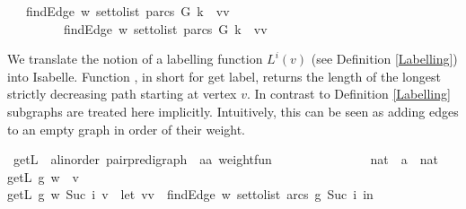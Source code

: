 \begin{isabellebody}
\ \ \ {\isachardoublequoteopen}{\isacharparenleft}findEdge\ w\ {\isacharparenleft}set{\isacharunderscore}to{\isacharunderscore}list\ {\isacharparenleft}parcs\ G{\isacharparenright}{\isacharparenright}\ k{\isacharparenright}\ {\isacharequal}\ {\isacharparenleft}vv\ \isanewline
\ \ \ \ \ \ \ \ {\isasymor}\ {\isacharparenleft}findEdge\ w\ {\isacharparenleft}set{\isacharunderscore}to{\isacharunderscore}list\ {\isacharparenleft}parcs\ G{\isacharparenright}{\isacharparenright}\ k{\isacharparenright}\ {\isacharequal}\ {\isacharparenleft}vv%
\isadelimproof
%
\endisadelimproof
%
\isatagproof
%
\endisatagproof
{\isafoldproof}%
%
\isadelimproof
%
\endisadelimproof
%
\isadelimproof
%
\endisadelimproof
%
\isatagproof
%
\endisatagproof
{\isafoldproof}%
%
\isadelimproof
%
\endisadelimproof
%
\isadelimproof
%
\endisadelimproof
%
\isatagproof
%
\endisatagproof
{\isafoldproof}%
%
\isadelimproof
%
\endisadelimproof
%
\begin{isamarkuptext}%
We translate the notion of a labelling function $L^i(v)$ (see Definition \ref{Labelling}) into Isabelle.
Function , in short for get label, returns the length of the longest strictly decreasing
path starting at vertex $v$. In contrast to Definition \ref{Labelling} subgraphs are treated here implicitly. Intuitively,
this can be seen as adding edges to an empty graph in order of their weight.%
\end{isamarkuptext}\isamarkuptrue%
\isamarkupfalse%
\ getL\ {\isacharcolon}{\isacharcolon}\ {\isachardoublequoteopen}{\isacharparenleft}{\isacharprime}a{\isacharcolon}{\isacharcolon}linorder{\isacharparenright}\ pair{\isacharunderscore}pre{\isacharunderscore}digraph\ {\isasymRightarrow}\ {\isacharparenleft}{\isacharprime}a{\isasymtimes}{\isacharprime}a{\isacharparenright}\ weight{\isacharunderscore}fun\ \isanewline
\ \ \ \ \ \ \ \ \ \ \ \ \ {\isasymRightarrow}\ nat\ {\isasymRightarrow}\ {\isacharprime}a\ {\isasymRightarrow}\ nat{\isachardoublequoteclose}\ \isanewline
{\isachardoublequoteopen}getL\ g\ w\ {}\ v\ {\isacharequal}\ {}{\isachardoublequoteclose}\ {\isacharbar}\ \ \isanewline
{\isachardoublequoteopen}getL\ g\ w\ {\isacharparenleft}Suc\ i{\isacharparenright}\ v\ {\isacharequal}\ {\isacharparenleft}let\ {\isacharparenleft}vv\ {\isacharequal}\ {\isacharparenleft}findEdge\ w\ {\isacharparenleft}set{\isacharunderscore}to{\isacharunderscore}list\ {\isacharparenleft}arcs\ g{\isacharparenright}{\isacharparenright}\ {\isacharparenleft}Suc\ i{\isacharparenright}{\isacharparenright}\ in\ \isanewline

\end{isabellebody}
